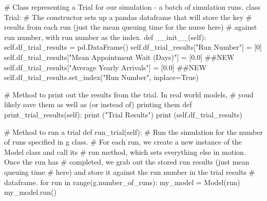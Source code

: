 \documentclass[
  letterpaper,
  DIV=11,
  numbers=noendperiod]{scrreprt}
\newenvironment{Shaded}{\begin{snugshade}}{\end{snugshade}}
\newcommand{\BuiltInTok}[1]{\textcolor[rgb]{0.00,0.23,0.31}{#1}}
\newcommand{\CommentTok}[1]{\textcolor[rgb]{0.37,0.37,0.37}{#1}}
\newcommand{\ControlFlowTok}[1]{\textcolor[rgb]{0.00,0.23,0.31}{#1}}
\newcommand{\DecValTok}[1]{\textcolor[rgb]{0.68,0.00,0.00}{#1}}
\newcommand{\FloatTok}[1]{\textcolor[rgb]{0.68,0.00,0.00}{#1}}
\newcommand{\FunctionTok}[1]{\textcolor[rgb]{0.28,0.35,0.67}{#1}}
\newcommand{\KeywordTok}[1]{\textcolor[rgb]{0.00,0.23,0.31}{#1}}
\newcommand{\NormalTok}[1]{\textcolor[rgb]{0.00,0.23,0.31}{#1}}
\newcommand{\OperatorTok}[1]{\textcolor[rgb]{0.37,0.37,0.37}{#1}}
\newcommand{\StringTok}[1]{\textcolor[rgb]{0.13,0.47,0.30}{#1}}
\newcommand{\VariableTok}[1]{\textcolor[rgb]{0.07,0.07,0.07}{#1}}
\begin{document}
\begin{Shaded}
\begin{Highlighting}[]
\CommentTok{\# Class representing a Trial for our simulation {-} a batch of simulation runs.}
\KeywordTok{class}\NormalTok{ Trial:}
    \CommentTok{\# The constructor sets up a pandas dataframe that will store the key}
    \CommentTok{\# results from each run (just the mean queuing time for the nurse here)}
    \CommentTok{\# against run number, with run number as the index.}
    \KeywordTok{def}  \FunctionTok{\_\_init\_\_}\NormalTok{(}\VariableTok{self}\NormalTok{):}
        \VariableTok{self}\NormalTok{.df\_trial\_results }\OperatorTok{=}\NormalTok{ pd.DataFrame()}
        \VariableTok{self}\NormalTok{.df\_trial\_results[}\StringTok{"Run Number"}\NormalTok{] }\OperatorTok{=}\NormalTok{ [}\DecValTok{0}\NormalTok{]}
        \VariableTok{self}\NormalTok{.df\_trial\_results[}\StringTok{"Mean Appointment Wait (Days)"}\NormalTok{] }\OperatorTok{=}\NormalTok{ [}\FloatTok{0.0}\NormalTok{] }\CommentTok{\#\#NEW}
        \VariableTok{self}\NormalTok{.df\_trial\_results[}\StringTok{"Average Yearly Arrivals"}\NormalTok{] }\OperatorTok{=}\NormalTok{ [}\FloatTok{0.0}\NormalTok{] }\CommentTok{\#\#NEW}
        \VariableTok{self}\NormalTok{.df\_trial\_results.set\_index(}\StringTok{"Run Number"}\NormalTok{, inplace}\OperatorTok{=}\VariableTok{True}\NormalTok{)}

    \CommentTok{\# Method to print out the results from the trial.  In real world models,}
    \CommentTok{\# you\textquotesingle{}d likely save them as well as (or instead of) printing them}
    \KeywordTok{def}\NormalTok{ print\_trial\_results(}\VariableTok{self}\NormalTok{):}
        \BuiltInTok{print}\NormalTok{ (}\StringTok{"Trial Results"}\NormalTok{)}
        \BuiltInTok{print}\NormalTok{ (}\VariableTok{self}\NormalTok{.df\_trial\_results)}

    \CommentTok{\# Method to run a trial}
    \KeywordTok{def}\NormalTok{ run\_trial(}\VariableTok{self}\NormalTok{):}
        \CommentTok{\# Run the simulation for the number of runs specified in g class.}
        \CommentTok{\# For each run, we create a new instance of the Model class and call its}
        \CommentTok{\# run method, which sets everything else in motion.  Once the run has}
        \CommentTok{\# completed, we grab out the stored run results (just mean queuing time}
        \CommentTok{\# here) and store it against the run number in the trial results}
        \CommentTok{\# dataframe.}
        \ControlFlowTok{for}\NormalTok{ run }\KeywordTok{in} \BuiltInTok{range}\NormalTok{(g.number\_of\_runs):}
\NormalTok{            my\_model }\OperatorTok{=}\NormalTok{ Model(run)}
\NormalTok{            my\_model.run()}


\end{Highlighting}
\end{Shaded}
\end{document}
